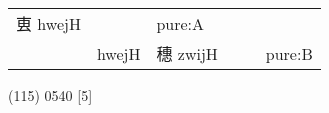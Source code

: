 \documentclass[14pt,a4paper]{scrartcl}
\begin{document}
\begin{longtable}[c]{@{}llllll@{}}
\begin{minipage}[t]{0.14\columnwidth}\raggedright\strut
叀 hwejH
\strut\end{minipage} &
\begin{minipage}[t]{0.14\columnwidth}\raggedright\strut
\strut\end{minipage} &
\begin{minipage}[t]{0.14\columnwidth}\raggedright\strut
pure:A
\strut\end{minipage}\tabularnewline
\begin{minipage}[t]{0.14\columnwidth}\raggedright\strut
𥝩
\strut\end{minipage} &
\begin{minipage}[t]{0.14\columnwidth}\raggedright\strut
hwejH
\strut\end{minipage} &
\begin{minipage}[t]{0.14\columnwidth}\raggedright\strut
穗 zwijH
\strut\end{minipage} &
\begin{minipage}[t]{0.14\columnwidth}\raggedright\strut
\strut\end{minipage} &
\begin{minipage}[t]{0.14\columnwidth}\raggedright\strut
\strut\end{minipage} &
\begin{minipage}[t]{0.14\columnwidth}\raggedright\strut
pure:B
\strut\end{minipage}\tabularnewline
\bottomrule
\end{longtable}

(115) 0540 {[}5{]}
\end{document}
